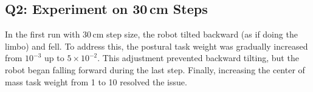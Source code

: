 \documentclass[12pt]{article}
\begin{document}
\subsection{Q2: Experiment on 30\,cm Steps}

In the first run with 30\,cm step size, the robot tilted backward (as if doing the limbo) and fell.  
To address this, the postural task weight was gradually increased from $10^{-3}$ up to $5\times10^{-2}$.  
This adjustment prevented backward tilting, but the robot began falling forward during the last step.  
Finally, increasing the center of mass task weight from 1 to 10 resolved the issue.
\end{document}
